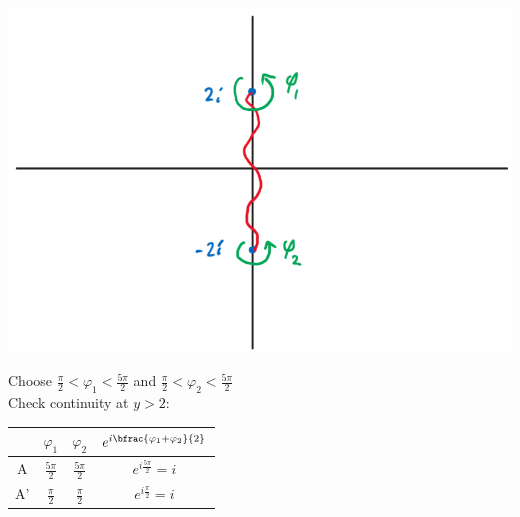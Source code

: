 \centerline{\includegraphics[scale=0.7]{Images/ComplexAnalysisPictures/2a.png}}
Choose $\frac{\pi}{2}<\varphi_1<\frac{5\pi}{2}$ and $\frac{\pi}{2}<\varphi_2<\frac{5\pi}{2}$\\
Check continuity at $y>2$:\\
\begin{tabular}{c|ccc}
     & $\varphi_1$ & $\varphi_2$ & $e^{i\bfrac{\varphi_1+\varphi_2}{2}}$\\
     \hline
     A & $\frac{5\pi}{2}$ & $\frac{5\pi}{2}$ & $e^{i\frac{5\pi}{2}}=i$\\
     A' & $\frac{\pi}{2}$ & $\frac{\pi}{2}$ & $e^{i\frac{\pi}{2}}=i$
\end{tabular}

